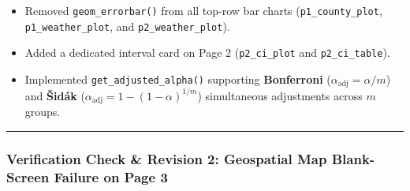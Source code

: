 \documentclass[
  letterpaper,
  DIV=11,
  numbers=noendperiod]{scrartcl}
\providecommand{\tightlist}{%
  \setlength{\itemsep}{0pt}\setlength{\parskip}{0pt}}
\begin{document}
\begin{itemize}
  \begin{itemize}
  \tightlist
  \item
    Removed \texttt{geom\_errorbar()} from all top-row bar charts
    (\texttt{p1\_county\_plot}, \texttt{p1\_weather\_plot}, and
    \texttt{p2\_weather\_plot}).
  \item
    Added a dedicated interval card on Page 2 (\texttt{p2\_ci\_plot} and
    \texttt{p2\_ci\_table}).
  \item
    Implemented \texttt{get\_adjusted\_alpha()} supporting
    \textbf{Bonferroni} (\(\alpha_{\text{adj}} = \alpha / m\)) and
    \textbf{Šidák} (\(\alpha_{\text{adj}} = 1 - (1 - \alpha)^{1/m}\))
    simultaneous adjustments across \(m\) groups.
  \end{itemize}
\end{itemize}

\begin{center}\rule{0.5\linewidth}{0.5pt}\end{center}

\subsubsection{Verification Check \& Revision 2: Geospatial Map
Blank-Screen Failure on Page
3}\label{verification-check-revision-2-geospatial-map-blank-screen-failure-on-page-3}
\end{document}
